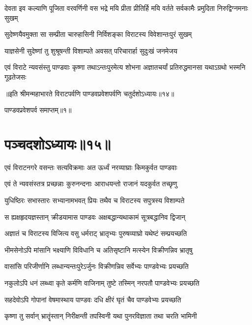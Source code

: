 \threelineshloka
{देवता इव कल्याणि पूजिता वरवर्णिनी}
{वस भद्रे मयि प्रीता प्रीतिर्हि मयि वर्तते}
{सर्वकामैः प्रमुदिता निरुद्विग्नमनाः सुखम्}



\twolineshloka
{सुदेष्णयैवमुक्ता सा सम्प्रीता चारुहासिनी}
{निर्विशङ्का विराटस्य विवेशान्तःपुरं सुखम्}


\twolineshloka
{याज्ञसेनी सुदेष्णां तु शुश्रूषन्ती विशाम्पते}
{अवसत् परिचारार्हा सुदुःखं जनमेजय}


\fourlineindentedshloka
{एवं विराटे न्यवसंस्तु पाण्डवाः}
{कृष्णा तथाऽन्तःपुरमेत्य शोभना}
{अज्ञातचर्यां प्रतिरुद्धमानसा}
{यथाऽग्रथो भस्मनि गूढतेजसः}

॥इति श्रीमन्महाभारते विराटपर्वणि पाण्डवप्रवेशपर्वणि चतुर्दशोऽध्यायः॥१४॥ 

पाण्डवप्रवेशपर्व समाप्तम्॥१॥

\chapter{पञ्चदशोऽध्यायः॥१५॥}

\twolineshloka
{एवं विराटनगरे वसन्तः सत्यविक्रमाः}
{अत ऊर्ध्वं नरव्याघ्राः किमकुर्वत पाण्डवाः}



\twolineshloka
{एवं ते न्यवसंस्तत्र प्रच्छन्नाः कुरुनन्दनाः}
{आराधयन्तो राजानं यदकुर्वत तच्छृणु}


\twolineshloka
{युधिष्ठिरः सभास्तारः सभ्यानामभवत् प्रियः}
{तथैव च विराटस्य सपुत्रस्य विशाम्पते}


\twolineshloka
{स ह्यक्षहृदयज्ञस्तान् क्रीडयामास पाण्डवः}
{अक्षबद्धान्यथाकामं सूत्रबद्धानिव द्विजान्}


\twolineshloka
{अज्ञातं च विराटस्य विजित्य वसु धर्मराट्}
{भ्रातृभ्यः पुरुषव्याघ्रो यथेष्टं सम्प्रयच्छति}


\twolineshloka
{भीमसेनोऽपि मांसानि भक्ष्याणि विविधानि च}
{अतिसृष्टानि मत्स्येन विक्रीणन्निव भ्रातृषु}


\twolineshloka
{वासांसि परिजीर्णानि लब्धान्यन्तःपुरेऽर्जुनः}
{विक्रीणन्निव सर्वेभ्यः पाण्डवेभ्यः प्रयच्छति}


\twolineshloka
{नकुलोऽपि धनं लब्ध्वा कृते कर्मणि वाजिनाम्}
{तुष्टे तस्मिन् नरपतौ पाण्डवेभ्यः प्रयच्छति}


\twolineshloka
{सहदेवोऽपि गोपानां वेषमास्थाय पाण्डवः}
{दधि क्षीरं घृतं चैव पाण्डवेभ्यः प्रयच्छति}


\twolineshloka
{कृष्णा तु सर्वान् भ्रातॄंस्तान् निरीक्षन्ती तपस्विनी}
{यथा पुनरविज्ञाता तथा चरति भामिनी}


